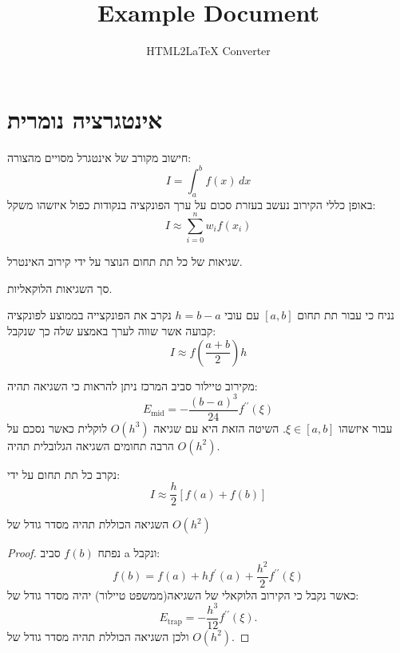 \documentclass{tstextbook}
\begin{document}
\title{Example Document}
\author{HTML2LaTeX Converter}
\maketitle


\section{אינטגרציה נומרית}

\begin{definition}
חישוב מקורב של אינטגרל מסויים מהצורה:
$$I=\int_{a}^{b}f(x)\,d x$$
באופן כללי הקירוב נעשב בעזרת סכום על ערך הפונקציה בנקודות כפול איזשהו משקל:
$$I\approx\sum_{i=0}^{n}w_{i}f(x_{i})$$

\end{definition}
\begin{definition}
שגיאות של כל תת תחום הנוצר על ידי קירוב האינטרל.

\end{definition}
\begin{definition}
סך השגיאות הלוקאליות.

\end{definition}
\begin{definition}
נניח כי עבור תת תחום \([a,b]\) עם עובי \(h=b-a\) נקרב את הפונקצייה בממוצע לפונקציה קבועה אשר שווה לערך באמצע שלה כך שנקבל:
$$I\approx f\left({\frac{a+b}{2}}\right)h$$

\end{definition}
\begin{corollary}
מקירוב טיילור סביב המרכז ניתן להראות כי השגיאה תהיה:
$$E_{\mathrm{mid}}=-{\frac{(b-a)^{3}}{24}}f^{\prime\prime}(\xi)$$
עבור איזשהו \(\xi \in [a,b]\). השיטה הזאת היא עם שגיאה \(O(h^{3})\) לוקלית כאשר נסכם על הרבה תחומים השגיאה הגלובלית תהיה \(O(h^{2})\).

\end{corollary}
\begin{definition}
נקרב כל תת תחום על ידי:
$$I\approx\frac{h}{2}\left[f(a)+f(b)\right]$$

\end{definition}
\begin{corollary}
השגיאה הכוללת תהיה מסדר גודל של \(O(h^{2})\)

\end{corollary}
\begin{proof}
נפתח \(f(b)\) סביב a ונקבל:
$$f(b)=f(a)+h f^{\prime}(a)+{\frac{h^{2}}{2}}f^{\prime\prime}(\xi)$$
כאשר נקבל כי הקירוב הלוקאלי של השגיאה(ממשפט טיילור) יהיה מסדר גודל של:
$$E_{\mathrm{trap}}=-{\frac{h^{3}}{12}}f^{\prime\prime}(\xi).$$
ולכן השגיאה הכוללת תהיה מסדר גודל של \(O(h^{2})\).

\end{proof}
\end{document}
